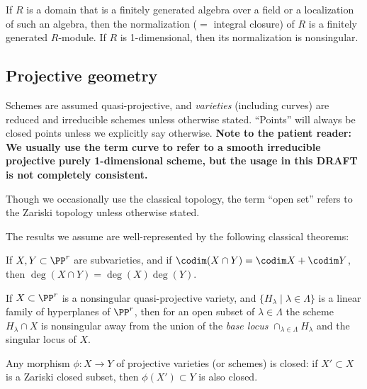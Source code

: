 \begin{theorem}\label{finiteness of normalization}
 If $R$ is a domain that is a finitely generated algebra over a field or a localization of such an algebra, then the
normalization ($=$ integral closure) of $R$ is a finitely generated $R$-module.
If $R$ is 1-dimensional, then its normalization is nonsingular.
\end{theorem}

\subsection{Projective geometry}
 
Schemes are assumed quasi-projective, and \emph{varieties} (including curves) are reduced and irreducible schemes unless otherwise stated. ``Points'' will always be closed points unless we explicitly say otherwise. 
{\bf Note to the patient reader: We usually use the term curve to refer to a smooth irreducible projective purely 1-dimensional scheme, but the usage in this DRAFT is not completely consistent.}

Though we occasionally use the classical topology, 
the term ``open set'' refers to the Zariski topology unless otherwise stated.

The results we assume are
 well-represented by the following classical theorems:

\begin{theorem}
If $X,Y\subset \PP^r$ are subvarieties, and if $\codim(X\cap Y) = \codim X + \codim Y$,
then $\deg (X\cap Y) = \deg(X)\deg(Y)$.
\end{theorem}

\begin{theorem}\label{Bertini}
If $X\subset \PP^r$  is a nonsingular quasi-projective variety, and $\{H_\lambda \mid \lambda\in \Lambda\}$ is a linear family of hyperplanes of $\PP^r$, then for an open subset of $\lambda\in \Lambda$ the scheme $H_\lambda \cap X$ is nonsingular away from the union of the \emph{base locus}
$
\cap_{\lambda \in \Lambda} H_\lambda
$
and the singular locus of $X$.
\end{theorem}

\begin{theorem}
 Any morphism $\phi: X\to Y$ of projective varieties (or schemes) is closed: if $X'\subset X$ is a Zariski closed subset,
 then $\phi(X') \subset Y$ is also closed.
\end{theorem}

